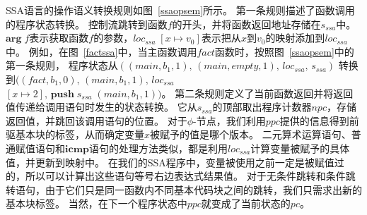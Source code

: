 SSA语言的操作语义转换规则如图~\ref{ssaopsem}所示。
第一条规则描述了函数调用的程序状态转换。
控制流跳转到函数$f$的开头，并将函数返回地址存储在$s_{ssa}$中。
$\mathbf{arg}\; f$表示获取函数$f$的参数，$loc_{ssa}\; [x\mapsto v_0]$表示把从$x$到$v_0$的映射添加到$loc_{ssa}$中。
例如，在图~\ref{factssa}中，当主函数调用$fact$函数时，按照图~\ref{ssaopsem}中的第一条规则，
程序状态从$((main,b_1,1),\, (main,empty,1),\, loc_{ssa},\, s_{ssa})$ 
转换到$((fact,b_1,0),\, (main,b_1,1),\, loc_{ssa}$ \\ $[x\mapsto 2],\, \mathbf{push}\; s_{ssa}\; (main,b_1,1))$。
第二条规则定义了当前函数返回并将返回值传递给调用语句时发生的状态转换。
它从$s_{ssa}$的顶部取出程序计数器$npc$，存储返回值，并跳回该调用语句的位置。
对于$\phi$-节点，我们利用$ppc$提供的信息得到前驱基本块的标签，从而确定变量$x$被赋予的值是哪个版本。
二元算术运算语句、普通赋值语句和$\mathbf{icmp}$语句的处理方法类似，都是利用$loc_{ssa}$计算变量被赋予的具体值，并更新到映射中。
在我们的SSA程序中，变量被使用之前一定是被赋值过的，所以可以计算出这些语句等号右边表达式结果值。
对于无条件跳转和条件跳转语句，由于它们只是同一函数内不同基本代码块之间的跳转，我们只需求出新的基本块标签。
当然，在下一个程序状态中$ppc$就变成了当前状态的$pc$。

